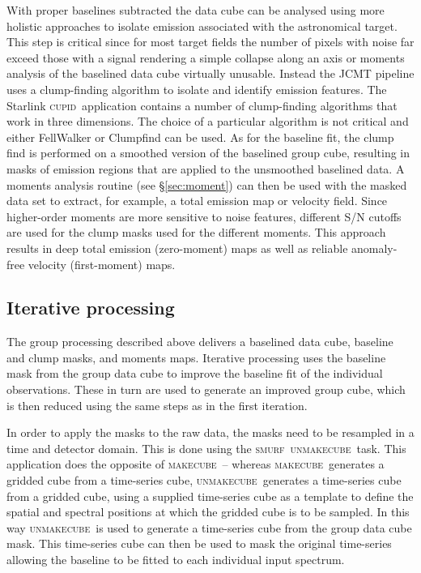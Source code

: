 \documentclass[a4paper,fleqn,usenatbib]{mnras}
\newcommand{\cupid}{\textsc{cupid}}
\newcommand{\smurf}{\textsc{smurf}}
\newcommand{\makecube}{\textsc{makecube}}
\newcommand{\unmakecube}{\textsc{unmakecube}}
\newcommand{\ascl}[1]{\href{http://www.ascl.net/#1}{ascl:#1}}
\begin{document}
With proper baselines subtracted the data cube can be analysed using more
holistic approaches to isolate emission associated with the astronomical
target. This step is critical since for most target fields the number of pixels with
noise far exceed those with a signal rendering a simple collapse along an axis
or moments analysis of the baselined data cube virtually unusable. Instead
the JCMT pipeline uses a clump-finding algorithm to isolate and identify
emission features.
The Starlink \cupid\ application contains
a number of clump-finding algorithms that work in three dimensions.
The choice of a particular algorithm is not critical and either FellWalker \citep{2015FW} or
Clumpfind \citep[][\ascl{1107.014}]{1994ApJ...428..693W} can be used.
As for the baseline fit, the clump find is performed on a smoothed version
of the baselined group cube, resulting in masks of emission regions that
are applied to the unsmoothed baselined data. A moments analysis routine
(see \mbox{\S \ref{sec:moment}}) can then be used with the masked data set to
extract, for example, a total emission map or velocity field. Since higher-order moments are
more sensitive to noise features, different S/N cutoffs are used for the
clump masks used for the different moments. This approach results in deep
total emission (zero-moment) maps as well as reliable anomaly-free
velocity (first-moment) maps.


\subsection{Iterative processing}

The group processing described above delivers a baselined data cube,
baseline and clump masks, and moments maps. Iterative processing uses
the baseline mask from the group data cube to improve the baseline fit
of the individual observations. These in turn are used to generate an improved
group cube, which is then reduced using the same steps as in the first iteration.

In order to apply the masks to the raw data, the masks need to be resampled
in a time and detector domain. This is done using the \smurf\ \unmakecube\ task.
This application
does the opposite of \makecube\ -- whereas \makecube\
generates a gridded cube from a time-series cube, \unmakecube\ generates
a time-series cube from a gridded cube, using a supplied time-series cube
as a template to define the spatial and spectral positions at which the
gridded cube is to be sampled. In this way \unmakecube\ is used to generate
a time-series cube from the group data cube mask. This time-series cube can
then be used to mask the original time-series allowing the baseline to be
fitted to each individual input spectrum.
\end{document}
